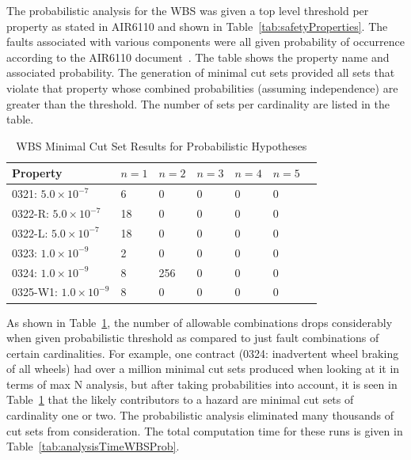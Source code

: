 The probabilistic analysis for the WBS was given a top level threshold per property as stated in AIR6110 and shown in Table~\ref{tab:safetyProperties}. The faults associated with various components were all given probability of occurrence according to the AIR6110 document~\cite{AIR6110}. The table shows the property name and associated probability. The generation of minimal cut sets provided all sets that violate that property whose combined probabilities (assuming independence) are greater than the threshold. The number of sets per cardinality are listed in the table. 

\begin{table}[htbp]
\begin{center}
    \begin{tabular}{ | l | l | l | l | l | l | l | }
    \hline
    \textbf{Property} & $n=1$ & $n=2$ & $n=3$ & $n=4$ 
		& $n=5$    \\ \hline \hline
    0321: $5.0 \times 10^{-7}$ & 6 & 0 & 0 & 0 & 0   \\ \hline
    0322-R: $5.0 \times 10^{-7}$ & 18 & 0 & 0 &0 &0   \\ \hline
    0322-L: $5.0 \times 10^{-7}$ & 18 & 0 & 0 & 0 & 0    \\ \hline
    0323: $1.0 \times 10^{-9}$ & 2 & 0 & 0 & 0 & 0    \\ \hline
    0324: $1.0 \times 10^{-9}$ & 8 & 256 & 0 & 0 & 0   \\ \hline
    0325-W1: $1.0 \times 10^{-9}$ & 8 & 0 & 0 &0 &0    \\ \hline
    \end{tabular}
    \caption{WBS Minimal Cut Set Results for Probabilistic Hypotheses}
    \label{tab:wbs_prob_results}
    \end{center}
\end{table}

As shown in Table~\ref{tab:wbs_prob_results}, the number of allowable combinations drops considerably when given probabilistic threshold as compared to just fault combinations of certain cardinalities. For example, one contract (0324: inadvertent wheel braking of all wheels) had over a million minimal cut sets produced when looking at it in terms of max N analysis, but after taking probabilities into account, it is seen in Table~\ref{tab:wbs_prob_results} that the likely contributors to a hazard are minimal cut sets of cardinality one or two. The probabilistic analysis eliminated many thousands of cut sets from consideration. The total computation time for these runs is given in Table~\ref{tab:analysisTimeWBSProb}.


